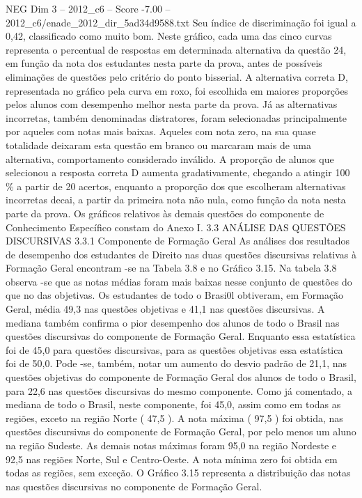 \begin{textsample}{NEG Dim 3 – 2012\_c6 – Score -7.00 – 2012\_c6/enade\_2012\_dir\_5ad34d9588.txt}
Seu índice de discriminação foi igual a 0,42, classificado como muito bom.
Neste gráfico, cada uma das cinco curvas representa o percentual de respostas em determinada alternativa da questão 24, em função da nota dos estudantes nesta parte da prova, antes de possíveis eliminações de questões pelo critério do ponto bisserial.
A alternativa correta D, representada no gráfico pela curva em roxo, foi escolhida em maiores proporções pelos alunos com desempenho melhor nesta parte da prova.
Já as alternativas incorretas, também denominadas distratores, foram selecionadas principalmente por aqueles com notas mais baixas.
Aqueles com nota zero, na sua quase totalidade deixaram esta questão em branco ou marcaram mais de uma alternativa, comportamento considerado inválido.
A proporção de alunos que selecionou a resposta correta D aumenta gradativamente, chegando a atingir 100 \% a partir de 20 acertos, enquanto a proporção dos que escolheram alternativas incorretas decai, a partir da primeira nota não nula, como função da nota nesta parte da prova.
Os gráficos relativos às demais questões do componente de Conhecimento Específico constam do Anexo I. 3.3 ANÁLISE DAS QUESTÕES DISCURSIVAS 3.3.1 Componente de Formação Geral As análises dos resultados de desempenho dos estudantes de Direito nas duas questões discursivas relativas à Formação Geral encontram -se na Tabela 3.8 e no Gráfico 3.15.
Na tabela 3.8 observa -se que as notas médias foram mais baixas nesse conjunto de questões do que no das objetivas.
Os estudantes de todo o Brasi0l obtiveram, em Formação Geral, média 49,3 nas questões objetivas e 41,1 nas questões discursivas.
A mediana também confirma o pior desempenho dos alunos de todo o Brasil nas questões discursivas do componente de Formação Geral.
Enquanto essa estatística foi de 45,0 para questões discursivas, para as questões objetivas essa estatística foi de 50,0.
Pode -se, também, notar um aumento do desvio padrão de 21,1, nas questões objetivas do componente de Formação Geral dos alunos de todo o Brasil, para 22,6 nas questões discursivas do mesmo componente.
Como já comentado, a mediana de todo o Brasil, neste componente, foi 45,0, assim como em todas as regiões, exceto na região Norte ( 47,5 ).
A nota máxima ( 97,5 ) foi obtida, nas questões discursivas do componente de Formação Geral, por pelo menos um aluno na região Sudeste.
As demais notas máximas foram 95,0 na região Nordeste e 92,5 nas regiões Norte, Sul e Centro-Oeste.
A nota mínima zero foi obtida em todas as regiões, sem exceção.
O Gráfico 3.15 representa a distribuição das notas nas questões discursivas no componente de Formação Geral.

\end{textsample}
